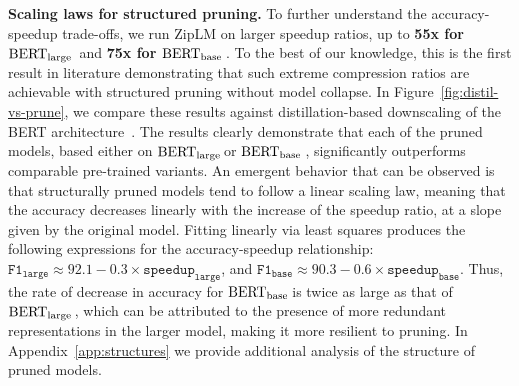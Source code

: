 \documentclass{article}
\newcommand{\bertbase}{$\textrm{BERT}_{\small{\textrm{base}}}\,$}
\newcommand{\bertlarge}{$\textrm{BERT}_{\small{\textrm{large}}}\,$}
\newcommand{\ourmethod}{ZipLM}
\theoremstyle{plain}
\theoremstyle{definition}
\theoremstyle{remark}
\renewcommand{\paragraph}[1]{ \noindent \textbf{#1}}
\begin{document}
\paragraph{Scaling laws for structured pruning.} To further understand the accuracy-speedup trade-offs, we run \ourmethod{} on larger speedup ratios, up to \textbf{55x for \bertlarge} and \textbf{75x for \bertbase}. To the best of our knowledge, this is the first result in literature demonstrating that such extreme compression ratios are achievable with structured pruning without model collapse. In Figure~\ref{fig:distil-vs-prune}, we compare these results against distillation-based downscaling of the BERT architecture~\cite{Turc2019WellReadSL}. The results clearly demonstrate that each of the pruned models, based either on \bertlarge or \bertbase, significantly outperforms comparable pre-trained variants. An emergent behavior that can be observed is that structurally pruned models tend to follow a linear scaling law, meaning that the accuracy decreases linearly with the increase of the speedup ratio, at a slope given by the original model. Fitting linearly via least squares produces the following expressions for the accuracy-speedup relationship: \mbox{$\texttt{F1}_{\texttt{large}} \approx 92.1 - 0.3 \times \texttt{speedup}_{\texttt{large}}$}, and \mbox{$\texttt{F1}_{\texttt{base}} \approx 90.3 - 0.6 \times \texttt{speedup}_{\texttt{base}}$}. Thus, the rate of decrease in accuracy for \bertbase is twice as large as that of \bertlarge, which can be attributed to the presence of more redundant representations in the larger model, making it more resilient to pruning. In Appendix~\ref{app:structures} we provide additional analysis of the structure of pruned models. 

\newpage

  


\newpage
\appendix
\end{document}
